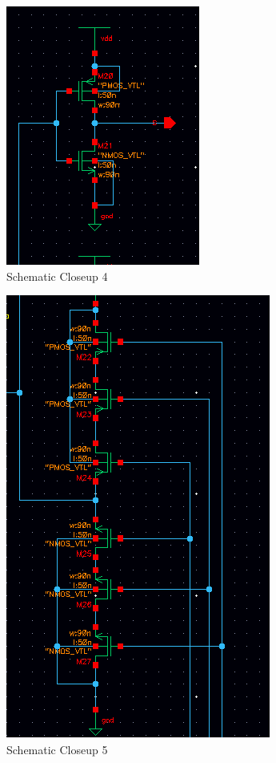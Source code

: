 \documentclass[12pt]{article}
\begin{document}
\begin{figure}[H]
\centering
\includegraphics[width=0.5\linewidth]{schematic-closeup-4}
\caption{Schematic Closeup 4}
\label{fig:schematic-closeup-4}
\end{figure}
\begin{figure}[H]
\centering
\includegraphics[width=0.5\linewidth]{schematic-closeup-5}
\caption{Schematic Closeup 5}
\label{fig:schematic-closeup-5}
\end{figure}
\end{document}
